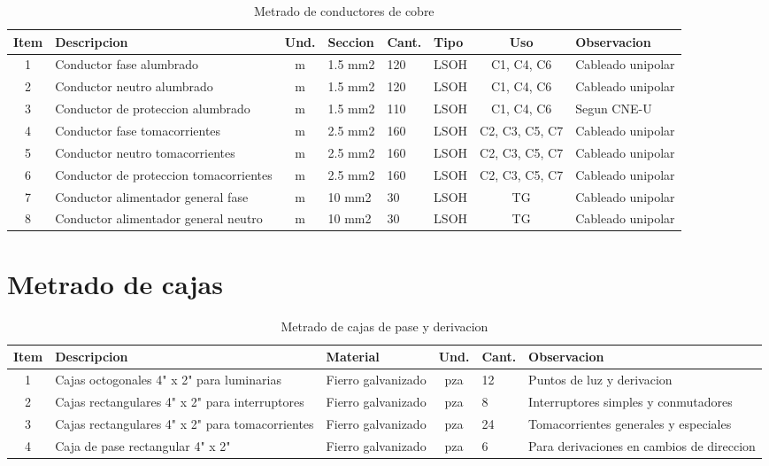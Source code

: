 \begin{landscape}
\begin{table}[H]
\centering
\small
\caption{Metrado de conductores de cobre}
\label{tab:metrado-conductores}
\begin{tabularx}{\textwidth}{c L{4.5cm} c L{1.8cm} L{1.8cm} L{1.8cm} c Y}
\toprule
\textbf{Item} & \textbf{Descripcion} & \textbf{Und.} & \textbf{Seccion} & \textbf{Cant.} & \textbf{Tipo} & \textbf{Uso} & \textbf{Observacion} \\
 & Conductor fase alumbrado & m & 1.5 mm2 & 120 & LSOH & C1, C4, C6 & Cableado unipolar \\
2 & Conductor neutro alumbrado & m & 1.5 mm2 & 120 & LSOH & C1, C4, C6 & Cableado unipolar \\
3 & Conductor de proteccion alumbrado & m & 1.5 mm2 & 110 & LSOH & C1, C4, C6 & Segun CNE-U \\
4 & Conductor fase tomacorrientes & m & 2.5 mm2 & 160 & LSOH & C2, C3, C5, C7 & Cableado unipolar \\
5 & Conductor neutro tomacorrientes & m & 2.5 mm2 & 160 & LSOH & C2, C3, C5, C7 & Cableado unipolar \\
6 & Conductor de proteccion tomacorrientes & m & 2.5 mm2 & 160 & LSOH & C2, C3, C5, C7 & Cableado unipolar \\
7 & Conductor alimentador general fase & m & 10 mm2 & 30 & LSOH & TG & Cableado unipolar \\
8 & Conductor alimentador general neutro & m & 10 mm2 & 30 & LSOH & TG & Cableado unipolar \\
\bottomrule
\end{tabularx}
\end{table}
\end{landscape}

\clearpage

\section{Metrado de cajas}

\begin{table}[H]
\centering
\small
\caption{Metrado de cajas de pase y derivacion}
\label{tab:metrado-cajas}
\begin{tabularx}{\textwidth}{c L{4.5cm} L{2.5cm} c L{2.5cm} Y}
\toprule
\textbf{Item} & \textbf{Descripcion} & \textbf{Material} & \textbf{Und.} & \textbf{Cant.} & \textbf{Observacion} \\
 & Cajas octogonales 4" x 2" para luminarias & Fierro galvanizado & pza & 12 & Puntos de luz y derivacion \\
2 & Cajas rectangulares 4" x 2" para interruptores & Fierro galvanizado & pza & 8 & Interruptores simples y conmutadores \\
3 & Cajas rectangulares 4" x 2" para tomacorrientes & Fierro galvanizado & pza & 24 & Tomacorrientes generales y especiales \\
4 & Caja de pase rectangular 4" x 2" & Fierro galvanizado & pza & 6 & Para derivaciones en cambios de direccion \\
\bottomrule
\end{tabularx}
\end{table}

